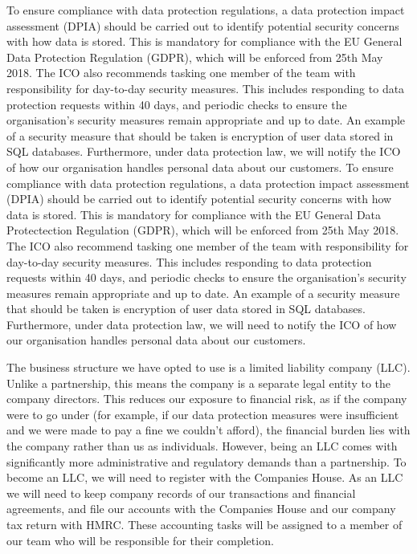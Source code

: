 \documentclass[10pt,a4paper]{article}
\begin{document}
To ensure compliance with data protection regulations, a data protection impact assessment (DPIA) should be carried out to identify potential security concerns with how data is stored. This is mandatory for compliance with the EU General Data Protection Regulation (GDPR), which will be enforced from 25th May 2018. The ICO also recommends tasking one member of the team with responsibility for day-to-day security measures. This includes responding to data protection requests within 40 days, and periodic checks to ensure the organisation's security measures remain appropriate and up to date. An example of a security measure that should be taken is encryption of user data stored in SQL databases. Furthermore, under data protection law, we will notify the ICO of how our organisation handles personal data about our customers.
To ensure compliance with data protection regulations, a data protection impact assessment (DPIA) should be carried out to identify potential security concerns with how data is stored. This is mandatory for compliance with the EU General Data Protectection Regulation (GDPR), which will be enforced from 25th May 2018. The ICO also recommend tasking one member of the team with responsibility for day-to-day security measures. This includes responding to data protection requests within 40 days, and periodic checks to ensure the organisation's security measures remain appropriate and up to date. An example of a security measure that should be taken is encryption of user data stored in SQL databases. Furthermore, under data protection law, we will need to notify the ICO of how our organisation handles personal data about our customers.

The business structure we have opted to use is a limited liability company (LLC). Unlike a partnership, this means the company is a separate legal entity to the company directors. This reduces our exposure to financial risk, as if the company were to go under (for example, if our data protection measures were insufficient and we were made to pay a fine we couldn't afford), the financial burden lies with the company rather than us as individuals. However, being an LLC comes with significantly more administrative and regulatory demands than a partnership. To become an LLC, we will need to register with the Companies House. As an LLC we will need to keep company records of our transactions and financial agreements, and file our accounts with the Companies House and our company tax return with HMRC. These accounting tasks will be assigned to a member of our team who will be responsible for their completion.
\end{document}
